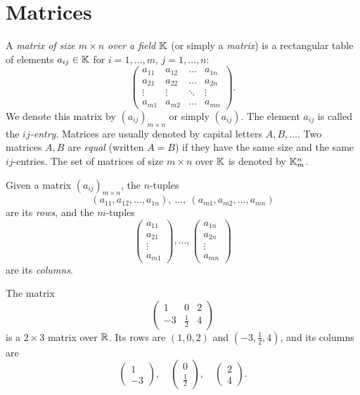 \section{Matrices}

\begin{definition}
A \emph{matrix of size $m\times n$ over a field $\mathbb{K}$} (or simply a \emph{matrix}) is a rectangular table of
elements $a_{ij}\in\mathbb{K}$ for $i=1,\ldots,m$, $j=1,\ldots,n$:
\[
\left( \begin{array}{cccc}
a_{11} & a_{12} & \ldots & a_{1n} \\
a_{21} & a_{22} & \ldots & a_{2n} \\
\vdots & \vdots & \ddots & \vdots \\
a_{m1} & a_{m2} & \ldots & a_{mn}
\end{array} \right).
\]
We denote this matrix by $(a_{ij})_{m\times n}$ or simply $(a_{ij})$. The element $a_{ij}$ is called the
\emph{$ij$-entry}. Matrices are usually denoted by capital letters $A,B,\ldots$. Two matrices $A,B$ are
\emph{equal} (written $A=B$) if they have the same size and the same $ij$-entries. The set of matrices of size
$m\times n$ over $\mathbb{K}$ is denoted by $\mathbb{K}_m^n$.
\end{definition}

\begin{definition}
Given a matrix $(a_{ij})_{m\times n}$, the $n$-tuples
\[
(a_{11}, a_{12}, \ldots, a_{1n}),\ \ldots,\ (a_{m1}, a_{m2}, \ldots, a_{mn})
\]
are its \emph{rows}, and the $m$-tuples
\[
\left( \begin{array}{c} a_{11}\\ a_{21} \\ \vdots \\ a_{m1} \end{array} \right), \ldots,
\left( \begin{array}{c} a_{1n} \\ a_{2n} \\ \vdots \\ a_{mn} \end{array} \right)
\]
are its \emph{columns}.
\end{definition}

\begin{example}
The matrix
\[
\left( \begin{array}{ccc}
1 & 0 & 2 \\
-3 & \tfrac{1}{2} & 4
\end{array} \right)
\]
is a $2\times 3$ matrix over $\mathbb{R}$. Its rows are $(1 , 0 , 2)$ and $(-3 , \tfrac{1}{2}, 4)$, and its columns are
\[
\left( \begin{array}{c} 1 \\ -3 \end{array} \right),\quad
\left( \begin{array}{c} 0 \\ \tfrac{1}{2} \end{array} \right),\quad
\left( \begin{array}{c} 2 \\ 4 \end{array} \right).
\]
\end{example}

